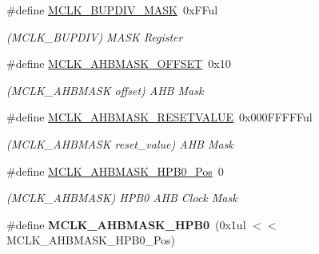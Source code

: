 \begin{DoxyCompactItemize}
\item 
\hypertarget{group___s_a_m_l21___m_c_l_k_ga739dd9b874d39d68e895360d192b61cb}{}\#define \hyperlink{group___s_a_m_l21___m_c_l_k_ga739dd9b874d39d68e895360d192b61cb}{M\+C\+L\+K\+\_\+\+B\+U\+P\+D\+I\+V\+\_\+\+M\+A\+S\+K}~0x\+F\+Ful\label{group___s_a_m_l21___m_c_l_k_ga739dd9b874d39d68e895360d192b61cb}

\begin{DoxyCompactList}\small\item\em (M\+C\+L\+K\+\_\+\+B\+U\+P\+D\+I\+V) M\+A\+S\+K Register \end{DoxyCompactList}\item 
\hypertarget{group___s_a_m_l21___m_c_l_k_gaf60da772fd92f5ac2d24529a4edd5bcf}{}\#define \hyperlink{group___s_a_m_l21___m_c_l_k_gaf60da772fd92f5ac2d24529a4edd5bcf}{M\+C\+L\+K\+\_\+\+A\+H\+B\+M\+A\+S\+K\+\_\+\+O\+F\+F\+S\+E\+T}~0x10\label{group___s_a_m_l21___m_c_l_k_gaf60da772fd92f5ac2d24529a4edd5bcf}

\begin{DoxyCompactList}\small\item\em (M\+C\+L\+K\+\_\+\+A\+H\+B\+M\+A\+S\+K offset) A\+H\+B Mask \end{DoxyCompactList}\item 
\hypertarget{group___s_a_m_l21___m_c_l_k_ga7416e817fc3532e446cfae94a314c2c1}{}\#define \hyperlink{group___s_a_m_l21___m_c_l_k_ga7416e817fc3532e446cfae94a314c2c1}{M\+C\+L\+K\+\_\+\+A\+H\+B\+M\+A\+S\+K\+\_\+\+R\+E\+S\+E\+T\+V\+A\+L\+U\+E}~0x000\+F\+F\+F\+F\+Ful\label{group___s_a_m_l21___m_c_l_k_ga7416e817fc3532e446cfae94a314c2c1}

\begin{DoxyCompactList}\small\item\em (M\+C\+L\+K\+\_\+\+A\+H\+B\+M\+A\+S\+K reset\+\_\+value) A\+H\+B Mask \end{DoxyCompactList}\item 
\hypertarget{group___s_a_m_l21___m_c_l_k_gaab73df1970914c738e069aa3f44343f7}{}\#define \hyperlink{group___s_a_m_l21___m_c_l_k_gaab73df1970914c738e069aa3f44343f7}{M\+C\+L\+K\+\_\+\+A\+H\+B\+M\+A\+S\+K\+\_\+\+H\+P\+B0\+\_\+\+Pos}~0\label{group___s_a_m_l21___m_c_l_k_gaab73df1970914c738e069aa3f44343f7}

\begin{DoxyCompactList}\small\item\em (M\+C\+L\+K\+\_\+\+A\+H\+B\+M\+A\+S\+K) H\+P\+B0 A\+H\+B Clock Mask \end{DoxyCompactList}\item 
\hypertarget{group___s_a_m_l21___m_c_l_k_gadfdec284630c9c471fd1d731464252a2}{}\#define {\bfseries M\+C\+L\+K\+\_\+\+A\+H\+B\+M\+A\+S\+K\+\_\+\+H\+P\+B0}~(0x1ul $<$$<$ M\+C\+L\+K\+\_\+\+A\+H\+B\+M\+A\+S\+K\+\_\+\+H\+P\+B0\+\_\+\+Pos)\label{group___s_a_m_l21___m_c_l_k_gadfdec284630c9c471fd1d731464252a2}


\end{DoxyCompactItemize}
